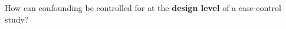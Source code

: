 How can confounding be controlled for at the {\bf design level} of a case-control study?
\begin{MultipleChoice}[itemname=II-18]
\end{MultipleChoice}

